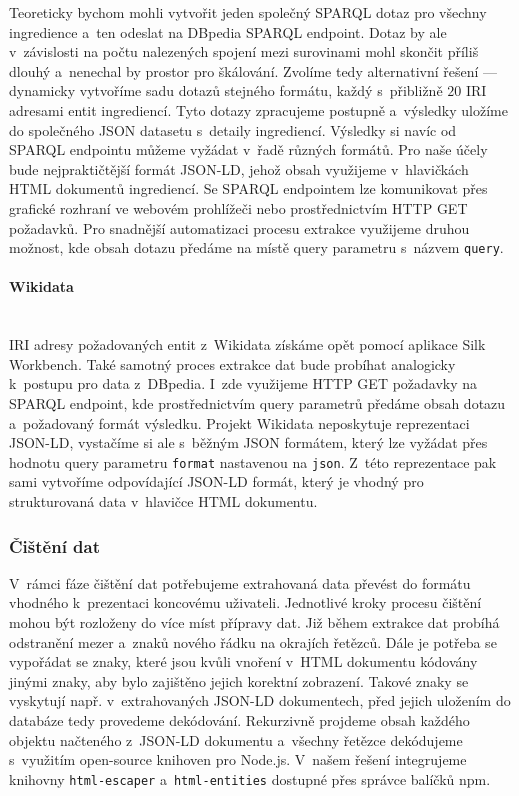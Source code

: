 Teoreticky bychom mohli vytvořit jeden společný SPARQL dotaz pro všechny ingredience a~ten odeslat na DBpedia SPARQL endpoint. Dotaz by ale v~závislosti na počtu nalezených spojení mezi surovinami mohl skončit příliš dlouhý a~nenechal by prostor pro škálování. Zvolíme tedy alternativní řešení --- dynamicky vytvoříme sadu dotazů stejného formátu, každý s~přibližně $20$ IRI adresami entit ingrediencí. Tyto dotazy zpracujeme postupně a~výsledky uložíme do společného JSON datasetu s~detaily ingrediencí. Výsledky si navíc od SPARQL endpointu můžeme vyžádat v~řadě různých formátů. Pro naše účely bude nejpraktičtější formát JSON-LD, jehož obsah využijeme v~hlavičkách HTML dokumentů ingrediencí. Se SPARQL endpointem lze komunikovat přes grafické rozhraní ve webovém prohlížeči nebo prostřednictvím HTTP GET požadavků. Pro snadnější automatizaci procesu extrakce využijeme druhou možnost, kde obsah dotazu předáme na místě query parametru s~názvem \texttt{query}.

\paragraph{Wikidata}\mbox{}\\

IRI adresy požadovaných entit z~Wikidata získáme opět pomocí aplikace Silk Workbench. Také samotný proces extrakce dat bude probíhat analogicky k~postupu pro data z~DBpedia. I~zde využijeme HTTP GET požadavky na SPARQL endpoint, kde prostřednictvím query parametrů předáme obsah dotazu a~požadovaný formát výsledku. Projekt Wikidata neposkytuje reprezentaci JSON-LD, vystačíme si ale s~běžným JSON formátem, který lze vyžádat přes hodnotu query parametru \texttt{format} nastavenou na \texttt{json}. Z~této reprezentace pak sami vytvoříme odpovídající JSON-LD formát, který je vhodný pro strukturovaná data v~hlavičce HTML dokumentu.

\subsubsection{Čištění dat}

V~rámci fáze čištění dat potřebujeme extrahovaná data převést do formátu vhodného k~prezentaci koncovému uživateli. Jednotlivé kroky procesu čištění mohou být rozloženy do více míst přípravy dat. Již během extrakce dat probíhá odstranění mezer a~znaků nového řádku na okrajích řetězců. Dále je potřeba se vypořádat se znaky, které jsou kvůli vnoření v~HTML dokumentu kódovány jinými znaky, aby bylo zajištěno jejich korektní zobrazení. Takové znaky se vyskytují např. v~extrahovaných JSON-LD dokumentech, před jejich uložením do databáze tedy provedeme dekódování. Rekurzivně projdeme obsah každého objektu načteného z~JSON-LD dokumentu a~všechny řetězce dekódujeme s~využitím open-source knihoven pro Node.js. V~našem řešení integrujeme knihovny \texttt{html-escaper} a~\texttt{html-entities} dostupné přes správce balíčků npm.

